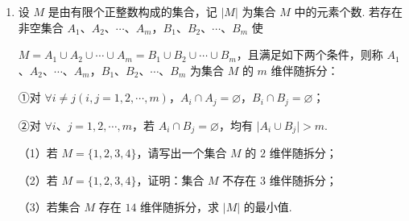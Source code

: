 \documentclass[a4paper,11pt]{article}
\begin{document}
\begin{enumerate}
\item 设 $M$ 是由有限个正整数构成的集合，记 $\lvert M\rvert$ 为集合 $M$ 中的元素个数. 若存在非空集合 $A_1$、$A_2$、$\cdots$、$A_m$，$B_1$、$B_2$、$\cdots$、$B_m$ 使

$M=A_1\cup A_2\cup\cdots\cup A_m=B_1\cup B_2\cup\cdots\cup B_m$，且满足如下两个条件，则称 $A_1$、$A_2$、$\cdots$、$A_m$，$B_1$、$B_2$、$\cdots$、$B_m$ 为集合 $M$ 的 $m$ 维伴随拆分：

①对 $\forall i\neq j(i,j=1,2,\cdots,m)$，$A_i\cap A_j=\varnothing$，$B_i\cap B_j=\varnothing$；

②对 $\forall i$、$j=1,2,\cdots,m$，若 $A_i\cap B_j=\varnothing$，均有 $\lvert A_i\cup B_j\rvert>m$.

（1）若 $M=\{1,2,3,4\}$，请写出一个集合 $M$ 的 $2$ 维伴随拆分；

（2）若 $M=\{1,2,3,4\}$，证明：集合 $M$ 不存在 $3$ 维伴随拆分；

（3）若集合 $M$ 存在 $14$ 维伴随拆分，求 $\lvert M\rvert$ 的最小值.

\ansspace*[16]


\end{enumerate}
\end{document}
